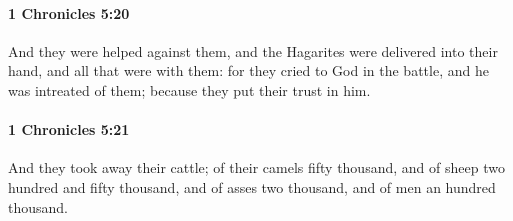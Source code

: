 		\paragraph{1 Chronicles 5:20} %
			\label{1CHRONICLES-5-20}

			And they were helped against them, and the Hagarites were delivered into their hand, and all that were with them: for they cried to God in the battle, and he was intreated of them; because they put their trust in him.


		\paragraph{1 Chronicles 5:21} %
			\label{1CHRONICLES-5-21}

			And they took away their cattle; of their camels fifty thousand, and of sheep two hundred and fifty thousand, and of asses two thousand, and of men an hundred thousand.

